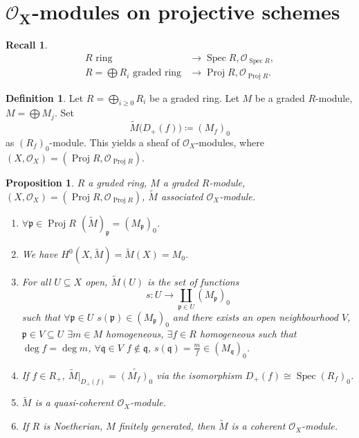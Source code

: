 \documentclass[12pt]{article}
\DeclareMathOperator{\Spec}{Spec}
\DeclareMathOperator{\Proj}{Proj}
\newtheorem*{proposition}{Proposition}
\theoremstyle{definition}
\newtheorem*{definition}{Definition}
\newtheorem*{recall}{Recall}
\begin{document}
\section{\texorpdfstring{$\boldsymbol{\mathcal O_X}$-m}{M}odules on projective schemes}

\begin{recall}
\begin{align*}
R\text{ ring}&\longrightarrow\Spec R,\mathcal O_{\Spec R},\\R=\bigoplus R_i\text{ graded ring}&\longrightarrow\Proj R,\mathcal O_{\Proj R}.
\end{align*}
\end{recall}

\begin{definition}
Let $R=\bigoplus_{i\geq0}R_i$ be a graded ring. Let $M$ be a graded $R$-module, $M=\bigoplus M_j$. Set
\[\widetilde M\big(D_+(f)\big)\coloneqq(M_f)_0\]
as $(R_f)_0$-module. This yields a sheaf of $\mathcal O_X$-modules, where $(X,\mathcal O_X)=(\Proj R,\mathcal O_{\Proj R})$.
\end{definition}

\begin{proposition}
$R$ a graded ring, $M$ a graded $R$-module, $(X,\mathcal O_X)=(\Proj R,\mathcal O_{\Proj R})$, $\widetilde M$ associated $\mathcal O_X$-module.

\begin{enumerate}[label=\arabic*)]
\item $\forall\mathfrak p\in\Proj R$ $(\widetilde M)_\mathfrak p=(M_\mathfrak p)_0$.

\item We have $H^0(X,\widetilde M)=\widetilde M(X)=M_0$.

\item For all $U\subseteq X$ open, $\widetilde M(U)$ is the set of functions
\[s:U\rightarrow\coprod_{\mathfrak p\in U}(M_\mathfrak p)_0\]
such that $\forall\mathfrak p\in U$ $s(\mathfrak p)\in(M_\mathfrak p)_0$ and there exists an open neighbourhood $V$, $\mathfrak p\in V\subseteq U$ $\exists m\in M$ homogeneous, $\exists f\in R$ homogeneous such that $\deg f=\deg m$, $\forall\mathfrak q\in V$ $f\notin\mathfrak q$, $s(\mathfrak q)=\frac mf\in(M_\mathfrak q)_0$.

\item If $f\in R_+$, $\widetilde M|_{D_+(f)}=\widetilde{(M_f)_0}$ via the isomorphism $D_+(f)\cong\Spec(R_f)_0$.

\item $\widetilde M$ is a quasi-coherent $\mathcal O_X$-module.

\item If $R$ is Noetherian, $M$ finitely generated, then $\widetilde M$ is a coherent $\mathcal O_X$-module.
\end{enumerate}
\end{proposition}
\end{document}

